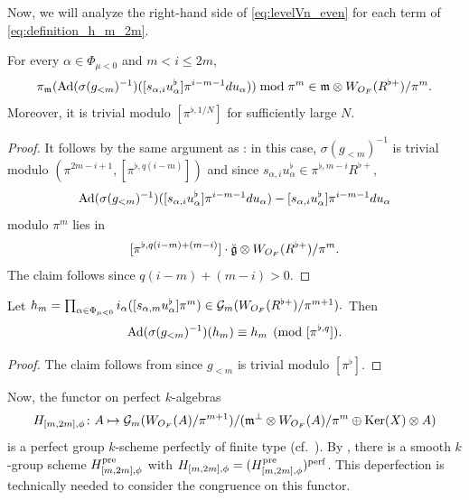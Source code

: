 \documentclass[12pt,reqno]{amsart}
\begin{document}
Now, we will analyze the right-hand side of \eqref{eq:levelVn_even} for each term of \eqref{eq:definition_h_m_2m}. 

\begin{lem} \label{lem:computepit_even}
    For every $\alpha \in \Phi_{\mu < 0}$ and $m < i \leq 2m$, 
    \[
        \pi_{{\mathfrak{m}}}({\operatorname{Ad}}(\sigma(g_{<m})^{-1})([s_{\alpha,i}u_\alpha^\flat]\pi^{i-m-1}du_\alpha)) \bmod \pi^m \in {\mathfrak{m}}\otimes W_{O_F}(R^{\flat +}) / \pi^m. 
    \]
    Moreover, it is trivial modulo $[\pi^{\flat, 1/N}]$ for sufficiently large $N$. 
\end{lem}
\begin{proof}
    It follows by the same argument as : in this case, $\sigma(g_{<m})^{-1}$ is trivial modulo $(\pi^{2m - i + 1}, [\pi^{\flat, q(i-m)}])$ and since $s_{\alpha,i}u_\alpha^\flat \in \pi^{\flat, m - i} R^{\flat +}$, 
    \[
        {\operatorname{Ad}}(\sigma(g_{<m})^{-1})([s_{\alpha,i}u_\alpha^\flat]\pi^{i-m-1}du_\alpha) - [s_{\alpha,i}u_\alpha^\flat]\pi^{i-m-1}du_\alpha 
    \]
    modulo $\pi^m$ lies in 
    \[
        [\pi^{\flat, q(i-m) + (m - i)}] \cdot {\mathfrak{\breve{g}}}\otimes W_{O_F}(R^{\flat +})/\pi^{m}. 
    \]
    The claim follows since 
    $
        q(i-m)  + (m - i) > 0. 
    $
\end{proof}

\begin{lem} \label{lem:redtoh_even}
    Let 
    $
        h_m = \prod_{\alpha \in \Phi_{\mu<0}} i_\alpha([s_{\alpha,m}u_\alpha^\flat]\pi^m) \in {\mathcal{G}}_m(W_{O_F}(R^{\flat +}) / \pi^{m + 1}). 
    $
    Then
    \[
        {\operatorname{Ad}}(\sigma(g_{<m})^{-1})(h_m) \equiv h_m \pmod{[\pi^{\flat, q}]}. 
    \]
\end{lem}
\begin{proof}
    The claim follows from  since $g_{<m}$ is trivial modulo $[\pi^{\flat}]$. 
\end{proof}

Now, the functor on perfect $k$-algebras
\[
    H_{[m, 2m], \phi} \colon A \mapsto {\mathcal{G}}_m(W_{O_F}(A) / \pi^{m + 1}) / ({\mathfrak{m}}^\perp \otimes W_{O_F}(A) / \pi^m \oplus {\operatorname{Ker}}(X) \otimes A)
\]
is a perfect group $k$-scheme perfectly of finite type (cf.\ \cite[Section 2.2]{Tak26_Yu}). By \cite[Lemma A.26]{Zhu17}, there is a smooth $k$-group scheme $H_{[m, 2m], \phi}^{\operatorname{pre}}$ with $H_{[m, 2m], \phi} = (H_{[m, 2m], \phi}^{\operatorname{pre}})^{\operatorname{perf}}$. This deperfection is technically needed to consider the congruence on this functor. 
\end{document}
